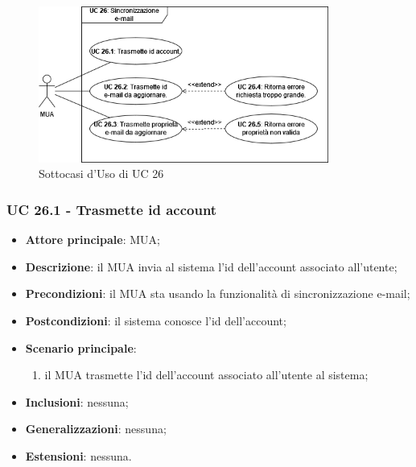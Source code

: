     \begin{figure}[H]
        \includegraphics[width=0.85\textwidth]{sections/uc_imgs/UC26.png}
        \centering
        \caption{Sottocasi d'Uso di UC 26}
    \end{figure}

    \subsubsection{UC 26.1 - Trasmette id account} \label{sec:UC26.1}
    \begin{itemize}
        \item \textbf{Attore principale}: MUA;
        \item \textbf{Descrizione}: il MUA invia al sistema l'id dell'account associato all'utente;
        \item \textbf{Precondizioni}: il MUA sta usando la funzionalità di sincronizzazione e-mail;
        \item \textbf{Postcondizioni}: il sistema conosce l'id dell'account;
        \item \textbf{Scenario principale}:
            \begin{enumerate}
                \item il MUA trasmette l'id dell'account associato all'utente al sistema;
            \end{enumerate}
        \item \textbf{Inclusioni}: nessuna;
        \item \textbf{Generalizzazioni}: nessuna;
        \item \textbf{Estensioni}: nessuna.
    \end{itemize}


